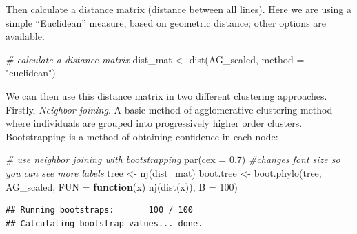 \documentclass[
]{book}
\newenvironment{Shaded}{\begin{snugshade}}{\end{snugshade}}
\newcommand{\AttributeTok}[1]{\textcolor[rgb]{0.77,0.63,0.00}{#1}}
\newcommand{\CommentTok}[1]{\textcolor[rgb]{0.56,0.35,0.01}{\textit{#1}}}
\newcommand{\ControlFlowTok}[1]{\textcolor[rgb]{0.13,0.29,0.53}{\textbf{#1}}}
\newcommand{\DecValTok}[1]{\textcolor[rgb]{0.00,0.00,0.81}{#1}}
\newcommand{\FloatTok}[1]{\textcolor[rgb]{0.00,0.00,0.81}{#1}}
\newcommand{\FunctionTok}[1]{\textcolor[rgb]{0.00,0.00,0.00}{#1}}
\newcommand{\NormalTok}[1]{#1}
\newcommand{\OtherTok}[1]{\textcolor[rgb]{0.56,0.35,0.01}{#1}}
\newcommand{\SpecialCharTok}[1]{\textcolor[rgb]{0.00,0.00,0.00}{#1}}
\newcommand{\StringTok}[1]{\textcolor[rgb]{0.31,0.60,0.02}{#1}}
\begin{document}
\begin{Shaded}
\end{Shaded}

Then calculate a distance matrix (distance between all lines). Here we are using a simple ``Euclidean'' measure, based on geometric distance; other options are available.

\begin{Shaded}
\begin{Highlighting}[]
\CommentTok{\# calculate a distance matrix}
\NormalTok{dist\_mat }\OtherTok{\textless{}{-}} \FunctionTok{dist}\NormalTok{(AG\_scaled, }\AttributeTok{method =} \StringTok{"euclidean"}\NormalTok{)}
\end{Highlighting}
\end{Shaded}

We can then use this distance matrix in two different clustering approaches. Firstly, \emph{Neighbor joining}. A basic method of agglomerative clustering method where individuals are grouped into progressively higher order clusters. Bootstrapping is a method of obtaining confidence in each node:

\begin{Shaded}
\begin{Highlighting}[]
\CommentTok{\# use neighbor joining with bootstrapping}
\FunctionTok{par}\NormalTok{(}\AttributeTok{cex =} \FloatTok{0.7}\NormalTok{)  }\CommentTok{\#changes font size so you can see more labels}
\NormalTok{tree }\OtherTok{\textless{}{-}} \FunctionTok{nj}\NormalTok{(dist\_mat)}
\NormalTok{boot.tree }\OtherTok{\textless{}{-}} \FunctionTok{boot.phylo}\NormalTok{(tree, AG\_scaled, }\AttributeTok{FUN =} \ControlFlowTok{function}\NormalTok{(x) }\FunctionTok{nj}\NormalTok{(}\FunctionTok{dist}\NormalTok{(x)), }
    \AttributeTok{B =} \DecValTok{100}\NormalTok{)}
\end{Highlighting}
\end{Shaded}

\begin{verbatim}
## Running bootstraps:       100 / 100
## Calculating bootstrap values... done.
\end{verbatim}
\end{document}
